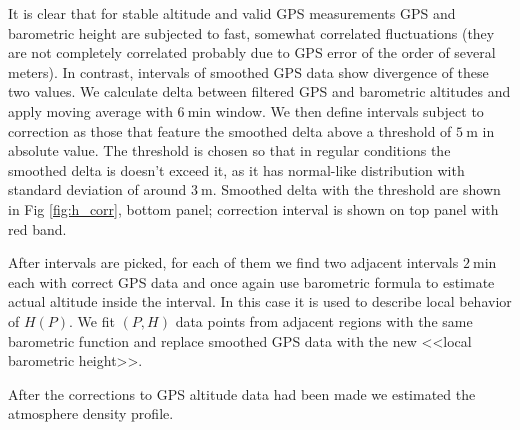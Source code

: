 \documentclass[final,5p,times,twocolumn]{elsarticle}
\begin{document}
It is clear that for stable altitude and valid GPS measurements GPS and barometric height are subjected to fast, somewhat correlated fluctuations (they are not completely correlated probably due to GPS error of the order of several meters). In contrast, intervals of smoothed GPS data show divergence of these two values. We calculate delta between filtered GPS and barometric altitudes and apply moving average with $6~\textrm{min}$ window. We then define intervals subject to correction as those that feature the smoothed delta above a threshold of $5~\textrm{m}$ in absolute value. The threshold is chosen so that in regular conditions the smoothed delta is doesn't exceed it, as it has normal-like distribution with standard deviation of around $3~\textrm{m}$. Smoothed delta with the threshold are shown in Fig \ref{fig:h_corr}, bottom panel; correction interval is shown on top panel with red band.



After intervals are picked, for each of them we find two adjacent intervals $2~\textrm{min}$ each with correct GPS data and once again use barometric formula to estimate actual altitude inside the interval. In this case it is used to describe local behavior of $H(P)$. We fit $(P, H)$ data points from adjacent regions with the same barometric function and replace smoothed GPS data with the new <<local barometric height>>.

After the corrections to GPS altitude data had been made we estimated the atmosphere density profile.
\end{document}
